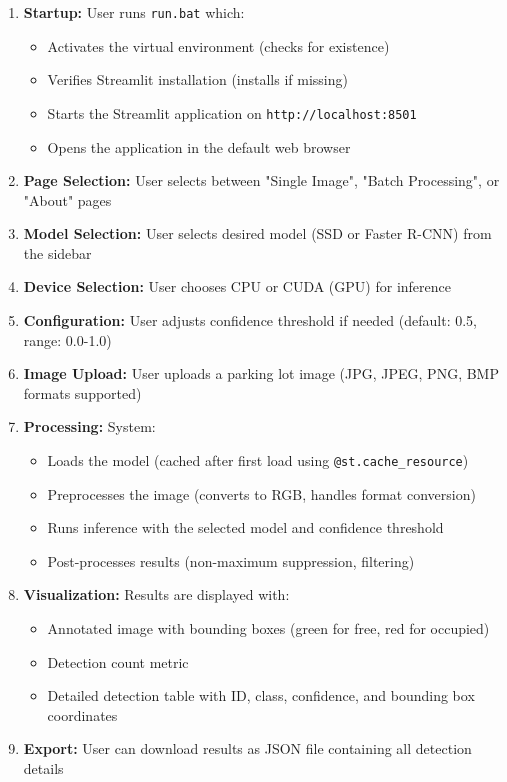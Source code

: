 \documentclass[12pt,a4paper]{article}
\begin{document}
\begin{enumerate}
    \item \textbf{Startup:} User runs \texttt{run.bat} which:
    \begin{itemize}
        \item Activates the virtual environment (checks for existence)
        \item Verifies Streamlit installation (installs if missing)
        \item Starts the Streamlit application on \texttt{http://localhost:8501}
        \item Opens the application in the default web browser
    \end{itemize}
    \item \textbf{Page Selection:} User selects between "Single Image", "Batch Processing", or "About" pages
    \item \textbf{Model Selection:} User selects desired model (SSD or Faster R-CNN) from the sidebar
    \item \textbf{Device Selection:} User chooses CPU or CUDA (GPU) for inference
    \item \textbf{Configuration:} User adjusts confidence threshold if needed (default: 0.5, range: 0.0-1.0)
    \item \textbf{Image Upload:} User uploads a parking lot image (JPG, JPEG, PNG, BMP formats supported)
    \item \textbf{Processing:} System:
    \begin{itemize}
        \item Loads the model (cached after first load using \texttt{@st.cache\_resource})
        \item Preprocesses the image (converts to RGB, handles format conversion)
        \item Runs inference with the selected model and confidence threshold
        \item Post-processes results (non-maximum suppression, filtering)
    \end{itemize}
    \item \textbf{Visualization:} Results are displayed with:
    \begin{itemize}
        \item Annotated image with bounding boxes (green for free, red for occupied)
        \item Detection count metric
        \item Detailed detection table with ID, class, confidence, and bounding box coordinates
    \end{itemize}
    \item \textbf{Export:} User can download results as JSON file containing all detection details
\end{enumerate}
\end{document}
